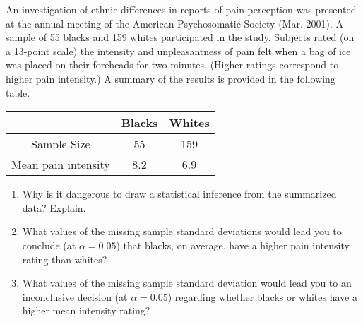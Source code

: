 
\begin{exercise}

An investigation of ethnic differences in reports of pain perception
was presented at the annual meeting of the American Psychosomatic Society
(Mar. 2001). A sample of 55 blacks and 159 whites participated in the study.
Subjects rated (on a 13-point scale) the intensity and unpleasantness of
pain felt when a bag of ice was placed on their foreheads for two minutes.
(Higher ratings correspond to higher pain intensity.)
A summary of the results is provided in the following table.

\begin{center}
    \begin{tabular}{c|cc}
        & Blacks & Whites \\
        \hline
        Sample Size & 55 & 159 \\
        Mean pain intensity & 8.2 & 6.9
    \end{tabular}
\end{center}

\begin{enumerate}[label = (\alph*)]
    \item Why is it dangerous to draw a statistical inference from the summarized data? Explain.
    \item What values of the missing sample standard deviations would lead
    you to conclude (at $\alpha = 0.05$) that blacks, on average, have
    a higher pain intensity rating than whites?
    \item What values of the missing sample standard deviation would lead
    you to an inconclusive decision (at $\alpha = 0.05$) regarding whether
    blacks or whites have a higher mean intensity rating?
\end{enumerate}

\end{exercise}


